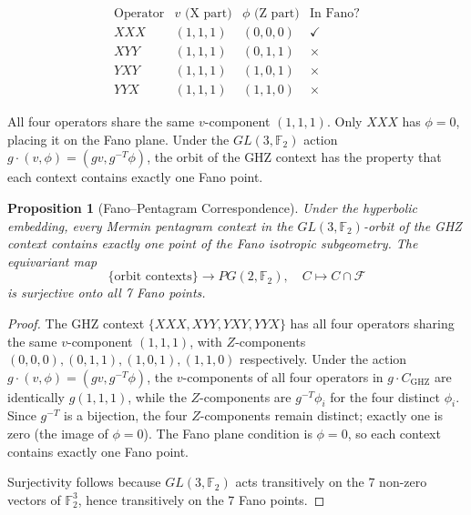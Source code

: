 \documentclass[11pt,a4paper]{article}
\newtheorem{proposition}[theorem]{Proposition}
\theoremstyle{remark}
\newcommand{\F}{\mathbb{F}}
\begin{document}
\[
\begin{array}{c|c|c|c}
\text{Operator} & v \text{ (X part)} & \phi \text{ (Z part)} & \text{In Fano?} \\ \hline
XXX & (1,1,1) & (0,0,0) & \checkmark \\
XYY & (1,1,1) & (0,1,1) & \times \\
YXY & (1,1,1) & (1,0,1) & \times \\
YYX & (1,1,1) & (1,1,0) & \times
\end{array}
\]

All four operators share the same $v$-component $(1,1,1)$. Only $XXX$
has $\phi = 0$, placing it on the Fano plane. Under the $GL(3, \F_2)$
action $g \cdot (v, \phi) = (gv, g^{-T}\phi)$, the orbit of the GHZ
context has the property that each context contains exactly one Fano point.

\begin{proposition}[Fano--Pentagram Correspondence]
\label{prop:fano-pentagram}
Under the hyperbolic embedding, every Mermin pentagram context in the
$GL(3, \F_2)$-orbit of the GHZ context contains exactly one point of
the Fano isotropic subgeometry. The equivariant map
\[
\{\text{orbit contexts}\} \longrightarrow PG(2, \F_2), \quad
C \mapsto C \cap \mathcal{F}
\]
is surjective onto all 7 Fano points.
\end{proposition}

\begin{proof}
The GHZ context $\{XXX, XYY, YXY, YYX\}$ has all four operators sharing
the same $v$-component $(1,1,1)$, with $Z$-components
$(0,0,0), (0,1,1), (1,0,1), (1,1,0)$ respectively. Under the action
$g \cdot (v, \phi) = (gv, g^{-T}\phi)$, the $v$-components of all four
operators in $g \cdot C_{\text{GHZ}}$ are identically $g(1,1,1)$, while
the $Z$-components are $g^{-T}\phi_i$ for the four distinct $\phi_i$.
Since $g^{-T}$ is a bijection, the four $Z$-components remain distinct;
exactly one is zero (the image of $\phi = 0$). The Fano plane condition
is $\phi = 0$, so each context contains exactly one Fano point.

Surjectivity follows because $GL(3, \F_2)$ acts transitively on the
7 non-zero vectors of $\F_2^3$, hence transitively on the 7 Fano points.
\qedhere
\end{proof}
\end{document}
